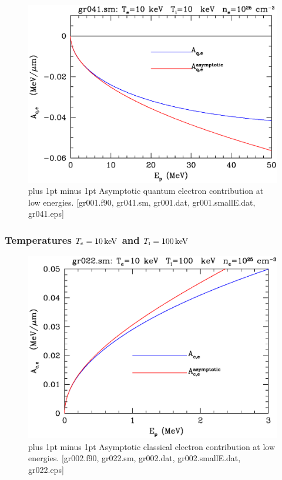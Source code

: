 \documentclass[preprint,12pt,eqsecnum,nofootinbib,amsmath,amssymb]{revtex4}
\newcommand{\smI}{{\rm\scriptscriptstyle I}}
\newcommand{\footnoteskip}{\baselineskip 12pt plus 1pt minus 1pt}
\begin{document}
\vskip-2cm 
\begin{figure}[h!]
\includegraphics[scale=0.45]{gr041.eps} 
\vskip-0.8cm 
\caption{\footnoteskip  
  Asymptotic quantum electron contribution at low
  energies. [gr001.f90, gr041.sm, gr001.dat, gr001.smallE.dat,
  gr041.eps]
}
\label{fig:gr041}
\end{figure}


\pagebreak
\subsubsection{Temperatures $T_e=10\,{\rm keV}$ and $T_\smI=100\,{\rm keV}$}

\vskip-2cm 
\begin{figure}[h!]
\includegraphics[scale=0.45]{gr022.eps} 
\vskip-0.5cm 
\caption{\footnoteskip  
  Asymptotic classical electron contribution at low
  energies. [gr002.f90, gr022.sm, gr002.dat, gr002.smallE.dat,
  gr022.eps]
}
\label{fig:gr022}
\end{figure}
\end{document}
